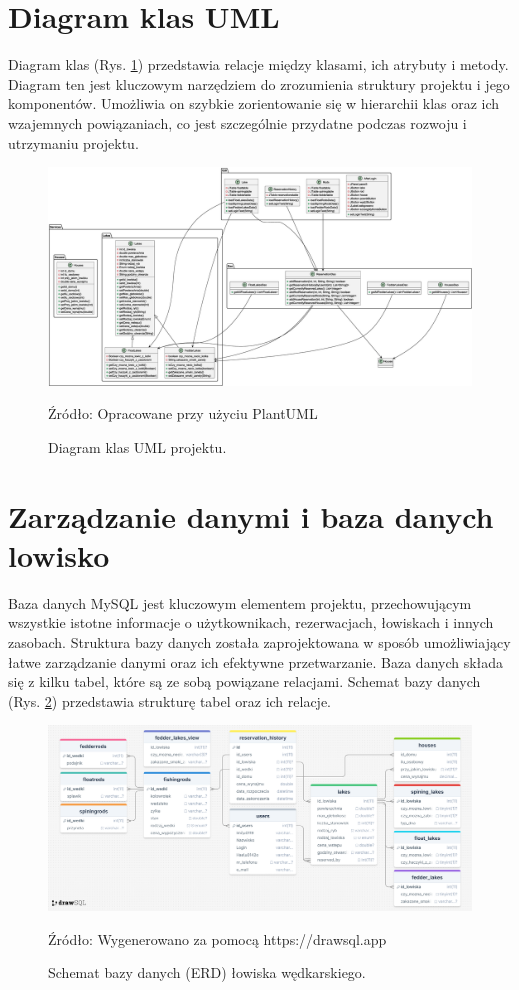 \section{Diagram klas UML} 
Diagram klas (Rys. \ref{fig:umldiagram}) przedstawia relacje między klasami, ich atrybuty i metody. Diagram ten jest kluczowym narzędziem do zrozumienia struktury projektu i jego komponentów. Umożliwia on szybkie zorientowanie się w hierarchii klas oraz ich wzajemnych powiązaniach, co jest szczególnie przydatne podczas rozwoju i utrzymaniu projektu.


\begin{figure}[H]
    \centering
    \includegraphics[width=1.1\linewidth]{figures/diagram.eps}
    \caption{Diagram klas UML projektu.}
    \label{fig:umldiagram}
    \small{Źródło: Opracowane przy użyciu PlantUML}
\end{figure}
\clearpage

\section{Zarządzanie danymi i baza danych lowisko}
\label{sec:baza_danych_nowe}
Baza danych MySQL jest kluczowym elementem projektu, przechowującym wszystkie istotne informacje o użytkownikach, rezerwacjach, łowiskach i innych zasobach. Struktura bazy danych została zaprojektowana w sposób umożliwiający łatwe zarządzanie danymi oraz ich efektywne przetwarzanie.
Baza danych składa się z kilku tabel, które są ze sobą powiązane relacjami. Schemat bazy danych (Rys. \ref{fig:erddiagram}) przedstawia strukturę tabel oraz ich relacje. 
\begin{figure}[H]
    \centering
    \includegraphics[width=\linewidth]{figures/dbd.eps}
    \caption{Schemat bazy danych (ERD) łowiska wędkarskiego.}
    \label{fig:erddiagram}
    \small{Źródło: Wygenerowano za pomocą https://drawsql.app}
\end{figure}
\clearpage

